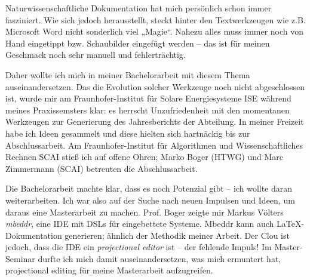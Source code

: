 Naturwissenschaftliche Dokumentation hat mich persönlich schon immer fasziniert.
Wie sich jedoch herausstellt, steckt hinter den Textwerkzeugen wie z.B. Microsoft Word
nicht sonderlich viel „Magie“. Nahezu alles muss immer noch von Hand eingetippt
bzw. Schaubilder eingefügt werden -- das ist für meinen Geschmack noch sehr manuell und fehlerträchtig.

Daher wollte ich mich in meiner Bachelorarbeit \citep{Hodapp} mit diesem Thema auseinandersetzen.
Das die Evolution solcher Werkzeuge noch nicht abgeschlossen ist, wurde
mir am Fraunhofer-Institut für Solare Energiesysteme ISE während meines Praxissemsters klar:
es herrscht Unzufriedenheit mit den momentanen Werkzeugen zur Generierung des Jahresberichts der Abteilung.
In meiner Freizeit habe ich Ideen gesammelt und diese hielten sich hartnäckig
bis zur Abschlussarbeit.
Am Fraunhofer-Institut für Algorithmen und Wissenschaftliches Rechnen SCAI stieß ich auf
offene Ohren; Marko Boger (HTWG) und Marc Zimmermann (SCAI) betreuten die Abschlussarbeit.

Die Bachelorarbeit machte klar,
dass es noch Potenzial gibt -- ich wollte daran weiterarbeiten.
Ich war also auf der Suche nach neuen Impulsen und Ideen, um daraus eine Masterarbeit zu machen.
Prof. Boger zeigte mir Markus Völters \emph{mbeddr}, eine IDE mit DSLs für eingebettete Systeme.
Mbeddr kann auch LaTeX-Dokumentation generieren; ähnlich der Methodik meiner Arbeit.
Der Clou ist jedoch, dass die IDE ein \emph{projectional editor} ist --
der fehlende Impuls! Im Master-Seminar durfte ich mich damit auseinandersetzen,
was mich ermuntert hat, projectional editing für meine Masterarbeit aufzugreifen.

